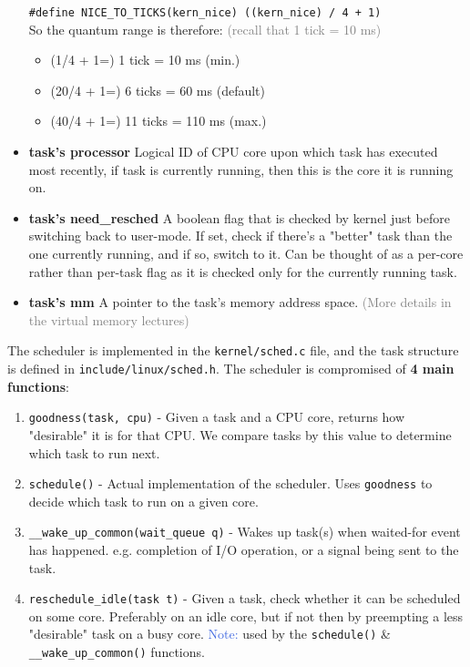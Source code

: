 \documentclass[openany,12pt]{book}
\newcommand{\code}[1]{\texttt{#1}}
\newcommand{\blue}[1]{\textcolor{RoyalBlue}{#1}}
\newcommand{\gray}[1]{\textcolor{gray}{#1}}
\begin{document}
\begin{itemize}
\begin{samepage}
              \code{\#define NICE\_TO\_TICKS(kern\_nice) ((kern\_nice) / 4 + 1)}\\
              So the quantum range is therefore: \gray{(recall that 1 tick = 10 ms)}
              \begin{itemize}
                  \item (1/4 + 1=) 1 tick = 10 ms (min.)
                  \item (20/4 + 1=) 6 ticks = 60 ms (default)
                  \item (40/4 + 1=) 11 ticks = 110 ms (max.)
              \end{itemize}

          \end{samepage}

    \item \textbf{task's processor} Logical ID of CPU core upon which task has executed most recently, if task is currently running, then this is the core it is running on.

    \item \textbf{task's need\_resched} A boolean flag that is checked by kernel just before switching back to user-mode. If set, check if there's a "better" task than the one currently running, and if so, switch to it. Can be thought of as a per-core rather than per-task flag as it is checked only for the currently running task.

    \item \textbf{task's mm} A pointer to the task's memory address space. \gray{(More details in the virtual memory lectures)}
\end{itemize}


The scheduler is implemented in the \code{kernel/sched.c} file, and the task structure is defined in \code{include/linux/sched.h}. The scheduler is compromised of \textbf{4 main functions}:
\begin{enumerate}
    \item \code{goodness(task, cpu)} - Given a task and a CPU core, returns how "desirable" it is for that CPU. We compare tasks by this value to determine which task to run next.
    \item \code{schedule()} - Actual implementation of the scheduler. Uses \code{goodness} to decide which task to run on a given core.
    \item \code{\_\_wake\_up\_common(wait\_queue q)} - Wakes up task(s) when waited-for event has happened. e.g. completion of I/O operation, or a signal being sent to the task.
    \item \code{reschedule\_idle(task t)} - Given a task, check whether it can be scheduled on some core. Preferably on an idle core, but if not then by preempting a less "desirable" task on a busy core. \blue{Note:} used by the \code{schedule()} \& \code{\_\_wake\_up\_common()} functions.
\end{enumerate}
\end{document}
